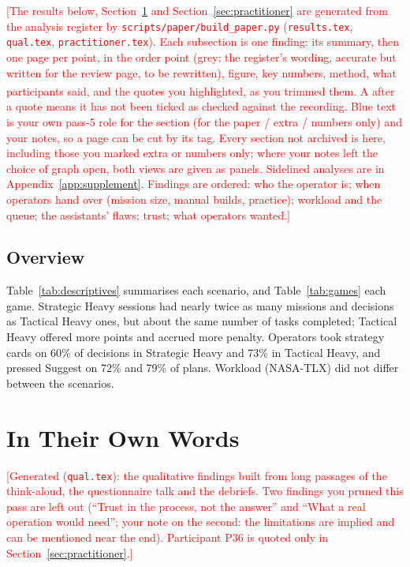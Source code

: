 \documentclass[10pt]{article}
\theoremstyle{definition}
\newcommand{\todo}[1]{\textcolor{red}{[#1]}}
\newcommand{\unchecked}{\textsuperscript{\dag}}
\begin{document}
\todo{The results below, Section~\ref{sec:qual} and Section~\ref{sec:practitioner} are generated from the analysis
register by \texttt{scripts/paper/build\_paper.py} (\texttt{results.tex}, \texttt{qual.tex}, \texttt{practitioner.tex}).
Each subsection is one finding: its summary, then one page per point, in the order point (grey: the register's
wording, accurate but written for the review page, to be rewritten), figure, key numbers, method, what participants
said, and the quotes you highlighted, as you trimmed them. A \unchecked{} after a quote means it has not been ticked as
checked against the recording. Blue text is your own pass-5 role for the section (for the paper / extra / numbers
only) and your notes, so a page can be cut by its tag. Every section not archived is here, including those you marked
extra or numbers only; where your notes left the choice of graph open, both views are given as panels. Sidelined
analyses are in Appendix~\ref{app:supplement}. Findings are ordered: who the operator is; when operators hand over
(mission size, manual builds, practice); workload and the queue; the assistants' flaws; trust; what operators
wanted.}

\subsection{Overview}\label{sec:res:overview}

Table~\ref{tab:descriptives} summarises each scenario, and Table~\ref{tab:games} each game. Strategic Heavy sessions
had nearly twice as many missions and decisions as Tactical Heavy ones, but about the same number of tasks completed;
Tactical Heavy offered more points and accrued more penalty. Operators took strategy cards on 60\% of decisions in
Strategic Heavy and 73\% in Tactical Heavy, and pressed Suggest on 72\% and 79\% of plans. Workload (NASA-TLX) did not
differ between the scenarios.



\FloatBarrier


\section{In Their Own Words}\label{sec:qual}

\todo{Generated (\texttt{qual.tex}): the qualitative findings built from long passages of the think-aloud, the
questionnaire talk and the debriefs. Two findings you pruned this pass are left out (``Trust in the process, not the
answer'' and ``What a real operation would need''; your note on the second: the limitations are implied and can be
mentioned near the end). Participant P36 is quoted only in Section~\ref{sec:practitioner}.}
\end{document}

